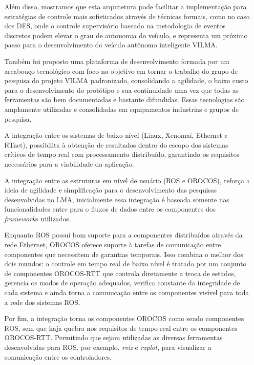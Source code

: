 \documentclass[conference]{IEEEtran}
\begin{document}
Além disso, mostramos que esta arquitetura pode facilitar a implementação para estratégias de controle mais sofisticados através de técnicas formais, como no caso dos DES, onde o controle supervisório baseado na metodologia de eventos discretos podem elevar o grau de autonomia do veículo, e representa um próximo passo para o desenvolvimento do veículo autônomo inteligente VILMA.

Também foi proposto uma plataforma de desenvolvimento formada por um arcabouço tecnológico com foco no objetivo em tornar o trabalho do grupo de pesquisa do projeto VILMA padronizado, consolidando a agilidade, o baixo custo para o desenvolvimento do protótipo e sua continuidade uma vez que todas as ferramentas são bem documentadas e bastante difundidas. Essas tecnologias são amplamente utilizadas e consolidadas em equipamentos industrias e grupos de pesquisa. 

A integração entre os sistemas de baixo nível (Linux, Xenomai, Ethernet e RTnet), possibilita à obtenção de resultados dentro do escopo dos sistemas críticos de tempo real com processamento distribuído, garantindo os requisitos necessários para a viabilidade da aplicação.

A integração entre as estruturas em nível de usuário (ROS e OROCOS), reforça a ideia de agilidade e simplificação para o desenvolvimento das pesquisas desenvolvidas no LMA, inicialmente essa integração é baseada somente nas funcionalidades entre para o fluxos de dados entre os componentes dos \textit{frameworks} utilizados.		

Enquanto ROS possui bom suporte para a componentes distribuídos através da rede Ethernet, OROCOS oferece suporte à tarefas de comunicação entre componentes que necessitem de garantias temporais. Isso combina o melhor dos dois mundos: o controle em tempo real de baixo nível é tratado por um conjunto de componentes OROCOS-RTT que controla diretamente a troca de estados, gerencia os modos de operação adequados, verifica constante da integridade de cada sistema e ainda torna a comunicação entre os componentes visível para toda a rede dos sistemas ROS.

Por fim, a integração torna os componentes OROCOS como sendo componentes ROS, sem que haja quebra nos requisitos de tempo real entre os componentes OROCOS-RTT. Permitindo que sejam utilizadas as diversas ferramentas desenvolvidas para ROS, por exemplo, \textit{rviz} e \textit{rxplot}, para visualizar a comunicação entre os controladores.

\end{document}
